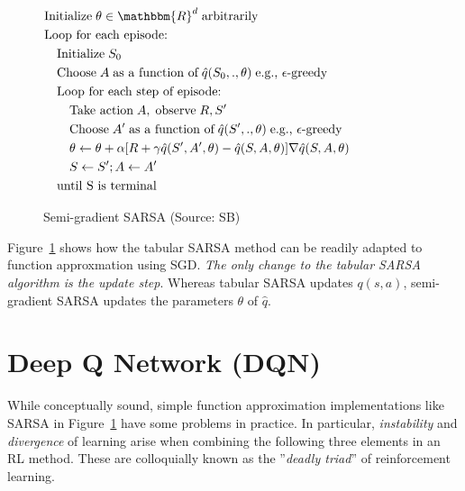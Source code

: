 \begin{figure}
\small
\begin{tcolorbox}[colback=code]
\vspace{-\baselineskip}
\begin{align*}
& \text{Initialize}\; \theta \in \mathbbm{R}^d \; \text{arbitrarily} \\
& \text{Loop for each episode:} \\
& \quad \text{Initialize}\; S_0 \\
& \quad \text{Choose}\; A \; \text{as a function of}\; \hat{q}(S_0, ., \theta) \; \text{e.g., $\epsilon$-greedy} \\ 
& \quad \text{Loop for each step of episode:} \\
& \quad \quad \text{Take action}\; A, \; \text{observe} \; R, S' \\
& \quad \quad \text{Choose}\; A' \; \text{as a function of}\; \hat{q}(S', ., \theta) \; \text{e.g., $\epsilon$-greedy} \\ 
& \quad \quad \theta \leftarrow \theta + \alpha [R + \gamma \hat{q}(S', A', \theta) - \hat{q}(S, A, \theta)] \nabla \hat{q}(S, A, \theta) \hspace{1in} \\
& \quad \quad S \leftarrow S'; A \leftarrow A'\\
& \quad \text{until S is terminal}
\end{align*}
\end{tcolorbox}
\caption[Semi-gradient SARSA]{Semi-gradient SARSA (Source: SB)}
\label{fig:gradientsarsa}
\end{figure}

Figure~\ref{fig:gradientsarsa} shows how the tabular SARSA method can be readily adapted to function approxmation using SGD. \emph{The only change to the tabular SARSA algorithm is the update step}. Whereas tabular SARSA updates $q(s, a)$, semi-gradient SARSA updates the parameters $\theta$ of $\hat{q}$. 

\section{Deep Q Network (DQN)}

While conceptually sound, simple function approximation implementations like SARSA in Figure~\ref{fig:gradientsarsa} have some problems in practice. In particular, \emph{instability} and \emph{divergence} of learning arise when combining the following three elements in an RL method. These are colloquially known as the ''\emph{deadly triad}'' of reinforcement learning.


